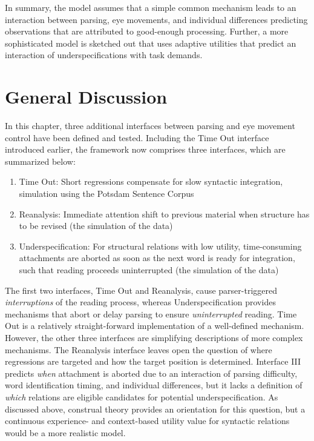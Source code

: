 \documentclass{cambridge7A}\usepackage[]{graphicx}\usepackage[]{color}
\begin{document}
In summary, the model assumes that a simple common mechanism leads to an interaction between parsing, eye movements, and individual differences predicting observations that are attributed to good-enough processing. Further, a more sophisticated model is sketched out that uses adaptive utilities that predict an interaction of underspecifications with task demands.


\section{General Discussion}
In this chapter, three additional interfaces between parsing and eye movement control have been defined and tested. Including the Time Out interface introduced earlier, the framework now comprises three interfaces, which are summarized below:

\begin{enumerate}
\item Time Out: Short regressions compensate for slow syntactic integration, simulation using the Potsdam Sentence Corpus
\item Reanalysis: Immediate attention shift to previous material when structure has to be revised (the simulation of the \cite{Staub2010a} data)
\item Underspecification:  For structural relations with low utility, time-consuming attachments are aborted as soon as the next word is ready for integration, such that reading proceeds uninterrupted (the simulation of the \cite{MalsburgVasishth2013} data)
\end{enumerate}

The first two interfaces, Time Out and Reanalysis, cause parser-triggered \emph{interruptions} of the reading process, whereas Underspecification provides mechanisms that abort or delay parsing to ensure \emph{uninterrupted} reading.
Time Out is a relatively straight-forward implementation of a well-defined mechanism. However, the other three interfaces are simplifying descriptions of more complex mechanisms. The  Reanalysis interface leaves open the question of where regressions are targeted and how the target position is determined. 
Interface III predicts \emph{when} attachment is aborted due to an interaction of parsing difficulty, word identification timing, and individual differences, but it lacks a definition of \emph{which} relations are eligible candidates for potential underspecification. As discussed above, construal theory provides an orientation for this question, but a continuous experience- and context-based utility value for syntactic relations would be a more realistic model. 
\end{document}
